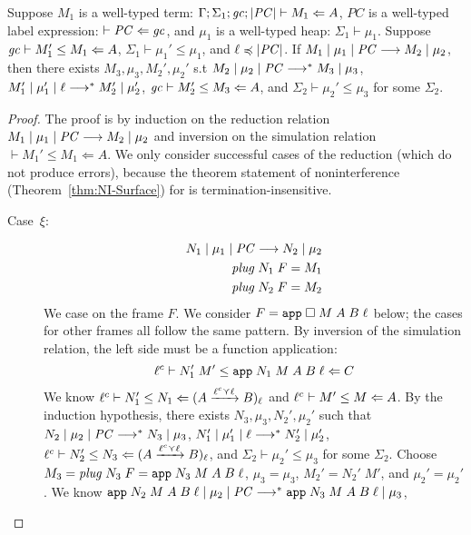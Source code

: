 \begin{lemma}
  \label{lem:sim-leq}
  Suppose $M_1$ is a well-typed \CC term: $\Gamma ; \Sigma_1 ; \mathit{gc} ; |\mathit{PC}| \vdash M_1 \Leftarrow A$,
  $PC$ is a well-typed label expression: $\vdash \mathit{PC} \Leftarrow \mathit{gc}$, and $\mu_1$ is a well-typed
  heap: $\Sigma_1 \vdash \mu_1$.
  Suppose $\mathit{gc} \vdash M_1' \leq M_1 \Leftarrow A$, $\Sigma_1 \vdash \mu_1' \leq \mu_1$, and $\ell \preccurlyeq |\mathit{PC}|$.
  If ${M_1}\mid{\mu_1}\mid{\ensuremath{\mathit{PC}}}\longrightarrow{M_2}\mid{\mu_2}$, then there exists $M_3, \mu_3, M_2', \mu_2'$ s.t
  ${M_2}\mid{\mu_2}\mid{\ensuremath{\mathit{PC}}}\longrightarrow^{*}{M_3}\mid{\mu_3}$,
  ${M_1'}\mid{\mu_1'}\mid{\ell}\longrightarrow^{*}{M_2'}\mid{\mu_2'}$,
  $\mathit{gc} \vdash M_2' \leq M_3 \Leftarrow A$,
  and $\Sigma_2 \vdash \mu_2' \leq \mu_3$ for some $\Sigma_2$.
\end{lemma}
\begin{proof}
  The proof is by induction on the reduction relation
  ${M_1}\mid{\mu_1}\mid{\ensuremath{\mathit{PC}}}\longrightarrow{M_2}\mid{\mu_2}$
  and inversion on the simulation relation
  $\vdash M_1' \leq M_1 \Leftarrow A$.
  We only consider successful cases of the reduction (which do not produce errors),
  because the theorem statement of noninterference (Theorem~\ref{thm:NI-Surface})
  for \Surface
  is termination-insensitive.
  \begin{description}
    \item[Case~$\xi$:]
      \begin{align}
      {N_1}\mid{\mu_1}\mid{\ensuremath{\mathit{PC}}}\longrightarrow{N_2}\mid{\mu_2} \\
      \mathit{plug}\;N_1\;F = M_1 \\
      \mathit{plug}\;N_2\;F = M_2
      \end{align}
      We case on the frame $F$. We consider $F=\text{\texttt{{app}}}\;{\Box}\;{M}\;{A}\;{B}\;{\ell}$ below;
      the cases for other frames all follow the same pattern.
      By inversion of the simulation relation, the left side must be a function application:
      \[
      {\ell^c}\vdash{N_1'\;M'}\leq{\ensuremath{\text{\texttt{{app}}}\;{N_1}\;{M}\;{A}\;{B}\;{\ell}}}\Leftarrow{C}
      \]
      We know ${\ell^c}\vdash{N_1'}\leq{N_1}\Leftarrow{(\ensuremath{{A}\xrightarrow{{\ell^c \curlyvee \ell}}{B}})_\ell}$ and ${\ell^c}\vdash{M'}\leq{M}\Leftarrow{A}$.
      By the induction hypothesis, there exists $N_3, \mu_3, N_2', \mu_2'$ such that
      ${N_2}\mid{\mu_2}\mid{\ensuremath{\mathit{PC}}}\longrightarrow^{*}{N_3}\mid{\mu_3}$, ${N_1'}\mid{\mu_1'}\mid{\ell}\longrightarrow^{*}{N_2'}\mid{\mu_2'}$,
      ${\ell^c}\vdash{N_2'}\leq{N_3}\Leftarrow{(\ensuremath{{A}\xrightarrow{{\ell^c \curlyvee \ell}}{B}})_\ell}$, and $\Sigma_2 \vdash \mu_2' \leq \mu_3$ for some $\Sigma_2$.
      Choose $M_3 = \mathit{plug}\;N_3\;F = \text{\texttt{{app}}}\;{N_3}\;{M}\;{A}\;{B}\;{\ell}$, $\mu_3 = \mu_3$, $M_2' = N_2'\;M'$,
      and $\mu_2' = \mu_2'$.
      We know ${\text{\texttt{{app}}}\;{N_2}\;{M}\;{A}\;{B}\;{\ell}}\mid{\mu_2}\mid{\ensuremath{\mathit{PC}}}\longrightarrow^{*}{\text{\texttt{{app}}}\;{N_3}\;{M}\;{A}\;{B}\;{\ell}}\mid{\mu_3}$,

\end{description}
\end{proof}
